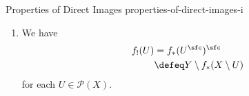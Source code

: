 \begin{proposition}{Properties of Direct Images \rmI}{properties-of-direct-images-i}
\begin{enumerate}
\[\begin{tikzcd}[row sep={5.0*\the\DL,between origins}, column sep={10.0*\the\DL,between origins}, background color=backgroundColor, ampersand replacement=\&]
                    \&
                    {\mathcal{P}(X')\times\mathcal{P}(Y')}
                    \arrow[d,"{\boxtimes_{X'\times Y'}}"]
                    \\
                    {\mathcal{P}(X\times Y)}
                    \arrow[r,"{(f\boxtimes_{X\times Y}g)_{!}}"']
                    \&
                    {\mathcal{P}(X'\times Y')}
                \end{tikzcd}
            \]%
            commutes, i.e.\ we have
            \[
                (f\boxtimes_{X\times Y}g)_{!}(U\boxtimes_{X\times Y}V)%
                =%
                f_{!}(U)\boxtimes_{X'\times Y'}g_{!}(V)%
            \]%
            for each $U\in\mathcal{P}(X)$ and each $V\in\mathcal{P}(Y)$.
        \item\label{properties-of-direct-images-i-relation-to-codirect-images}We have
            \begin{align*}
                f_{!}(U) &=      f_{*}(U^{\sfc})^{\sfc}\\%
                         &\defeq Y\setminus f_{*}(X\setminus U)%
            \end{align*}
            for each $U\in\mathcal{P}(X)$.
    \end{enumerate}
\end{proposition}
